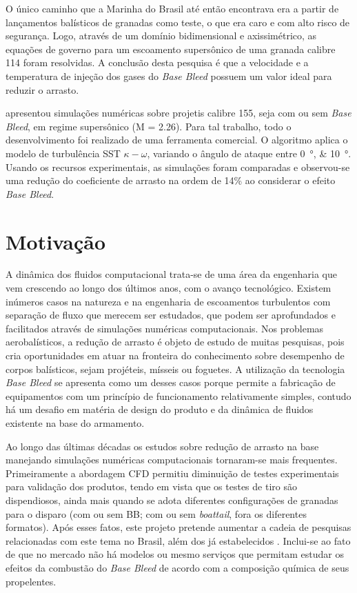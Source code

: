 O único caminho que a Marinha do Brasil até então encontrava era a partir de lançamentos balísticos de granadas como teste, o que era caro e com alto risco de segurança. Logo, através de um domínio bidimensional e axissimétrico, as equações de governo para um escoamento supersônico de uma granada calibre \qty{114}{\millimetre} foram resolvidas. A conclusão desta pesquisa é que a velocidade e a temperatura de injeção dos gases do \textit{Base Bleed} possuem um valor ideal para reduzir o arrasto.

\citeauthor{Reddy2021} apresentou simulações numéricas sobre projetis calibre \qty{155}{\millimetre}, seja com ou sem \textit{Base Bleed}, em regime supersônico (M = \num{2,26}). Para tal trabalho, todo o desenvolvimento foi realizado de uma ferramenta comercial. O algoritmo aplica o modelo de turbulência SST \(\kappa-\omega\), variando o ângulo de ataque entre \qtylist{0;10}{\degree}. Usando os recursos experimentais, as simulações foram comparadas e observou-se uma redução do coeficiente de arrasto na ordem de 14\% ao considerar o efeito \textit{Base Bleed}. 

\section{Motivação}

A dinâmica dos fluidos computacional trata-se de uma área da engenharia que vem crescendo ao longo dos últimos anos, com o avanço tecnológico. Existem inúmeros casos na natureza e na engenharia de escoamentos turbulentos com separação de fluxo que merecem ser estudados, que podem ser aprofundados e facilitados através de simulações numéricas computacionais. Nos problemas aerobalísticos, a redução de arrasto é objeto de estudo de muitas pesquisas, pois cria oportunidades em atuar na fronteira do conhecimento sobre desempenho de corpos balísticos, sejam projéteis, mísseis ou foguetes. A utilização da tecnologia \textit{Base Bleed} se apresenta como um desses casos porque permite a fabricação de equipamentos com um princípio de funcionamento relativamente simples, contudo há um desafio em matéria de design do produto e da dinâmica de fluidos existente na base do armamento.

Ao longo das últimas décadas os estudos sobre redução de arrasto na base manejando simulações numéricas computacionais tornaram-se mais frequentes. Primeiramente a abordagem CFD permitiu diminuição de testes experimentais para validação dos produtos, tendo em vista que os testes de tiro são dispendiosos, ainda mais quando se adota diferentes configurações de granadas para o disparo (com ou sem BB; com ou sem \textit{boattail}, fora os diferentes formatos). Após esses fatos, este projeto pretende aumentar a cadeia de pesquisas relacionadas com este tema no Brasil, além dos já estabelecidos \cite{Lucena2020, Rosendo2020, Gil2020}. Inclui-se ao fato de que no mercado não há modelos ou mesmo serviços que permitam estudar os efeitos da combustão do \textit{Base Bleed} de acordo com a composição química de seus propelentes. 
	
